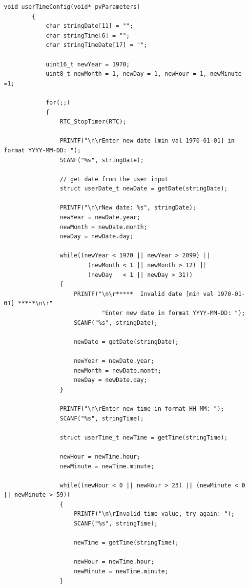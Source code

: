 \documentclass[12pt,a4paper]{article}
\begin{document}
        \begin{lstlisting}[label={lst:userTimeConfig}, caption=userTimeConfig() task]
        void userTimeConfig(void* pvParameters)
        {
            char stringDate[11] = "";
            char stringTime[6] = "";
            char stringTimeDate[17] = "";

            uint16_t newYear = 1970;
            uint8_t newMonth = 1, newDay = 1, newHour = 1, newMinute =1;

            for(;;)
            {
                RTC_StopTimer(RTC);

                PRINTF("\n\rEnter new date [min val 1970-01-01] in format YYYY-MM-DD: ");
                SCANF("%s", stringDate);

                // get date from the user input
                struct userDate_t newDate = getDate(stringDate);

                PRINTF("\n\rNew date: %s", stringDate);
                newYear = newDate.year;
                newMonth = newDate.month;
                newDay = newDate.day;

                while((newYear < 1970 || newYear > 2099) ||
                        (newMonth < 1 || newMonth > 12) ||
                        (newDay   < 1 || newDay > 31))
                {
                    PRINTF("\n\r*****  Invalid date [min val 1970-01-01] *****\n\r"
                            "Enter new date in format YYYY-MM-DD: ");
                    SCANF("%s", stringDate);

                    newDate = getDate(stringDate);

                    newYear = newDate.year;
                    newMonth = newDate.month;
                    newDay = newDate.day;
                }

                PRINTF("\n\rEnter new time in format HH-MM: ");
                SCANF("%s", stringTime);

                struct userTime_t newTime = getTime(stringTime);

                newHour = newTime.hour;
                newMinute = newTime.minute;

                while((newHour < 0 || newHour > 23) || (newMinute < 0 || newMinute > 59))
                {
                    PRINTF("\n\rInvalid time value, try again: ");
                    SCANF("%s", stringTime);

                    newTime = getTime(stringTime);

                    newHour = newTime.hour;
                    newMinute = newTime.minute;
                }


\end{lstlisting}
\end{document}
